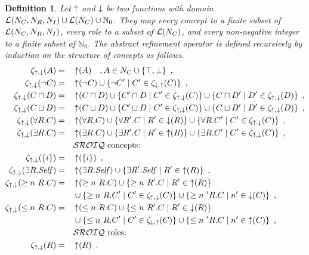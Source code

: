 \documentclass[
]{ceurart}
\newtheorem{definition}{Definition}
\begin{document}
\begin{definition}
  Let $\mathop{\uparrow}$ and $\mathop{\downarrow}$ be two functions with domain $\mathcal{L}(N_C, N_R, N_I) \cup \mathcal{L}(N_C) \cup \mathbb{N}_0$. They map every concept to a finite subset of $\mathcal{L}(N_C, N_R, N_I)$, every role to a subset of $\mathcal{L}(N_C)$, and every non-negative integer to a finite subset of $\mathbb{N}_0$.
  The \emph{abstract refinement operator} is defined recursively by induction on the structure of concepts as follows.
  {\footnotesize
  \begin{alignat*}{2}
    \zeta_{\refine,\corefine}(A) &= &&\refine(A) \quad, A \in N_C \cup \{\top, \bot\} \enspace, \\
    \zeta_{\refine,\corefine}(\lnot C) &= &&\refine(\lnot C) \cup \{ \lnot C' \mid C' \in \zeta_{\corefine,\refine}(C) \} \enspace, \\
    \zeta_{\refine,\corefine}(C \sqcap D) &= &&\refine(C \sqcap D) \cup \{ C' \sqcap D \mid C' \in \zeta_{\refine,\corefine}(C) \}
    \cup \{ C \sqcap D' \mid D' \in \zeta_{\refine,\corefine}(D) \} \enspace, \\
    \zeta_{\refine,\corefine}(C \sqcup D) &= &&\refine(C \sqcup D) \cup \{ C' \sqcup D \mid C' \in \zeta_{\refine,\corefine}(C) \}
    \cup \{ C \sqcup D' \mid D' \in \zeta_{\refine,\corefine}(D) \} \enspace, \\
    \zeta_{\refine,\corefine}(\forall R.C) &= &&\refine(\forall R.C) \cup \{ \forall R'.C \mid R' \in \corefine(R) \}
    \cup \{ \forall R.C' \mid C' \in \zeta_{\refine,\corefine}(C) \} \enspace, \\
    \zeta_{\refine,\corefine}(\exists R.C) &= &&\refine(\exists R.C) \cup \{ \exists R'.C \mid R' \in \refine(R) \}
    \cup \{ \exists R.C' \mid C' \in \zeta_{\refine,\corefine}(C) \} \enspace, \\
    &&& \text{\SROIQ concepts:} \\
    \zeta_{\refine,\corefine}(\nominal i) &= &&\refine(\nominal i) \enspace, \\
    \zeta_{\refine,\corefine}(\exists R.\self) &= &&\refine(\exists R.\self) \cup \{ \exists R'.\self \mid R' \in \refine(R) \} \enspace, \\
    \zeta_{\refine,\corefine}(\more n R.C) &= &&\refine(\more n R.C) \cup \{ \more n R'.C \mid R' \in \refine(R) \} \\
    &&& \cup \{ \more n R.C' \mid C' \in \zeta_{\refine,\corefine}(C) \}
    \cup \{ \more n' R.C \mid n' \in \corefine(C) \} \enspace, \\
    \zeta_{\refine,\corefine}(\less n R.C) &= &&\refine(\less n R.C) \cup \{ \less n R'.C \mid R' \in \corefine(R) \} \\
    &&& \cup \{ \less n R.C' \mid C' \in \zeta_{\corefine,\refine}(C) \}
    \cup \{ \less n' R.C \mid n' \in \refine(C) \} \enspace, \\
    &&& \text{\SROIQ roles:} \\
    \zeta_{\refine,\corefine}(R) &= &&\refine(R) \enspace.
  \end{alignat*}
  }


\end{definition}
\end{document}
